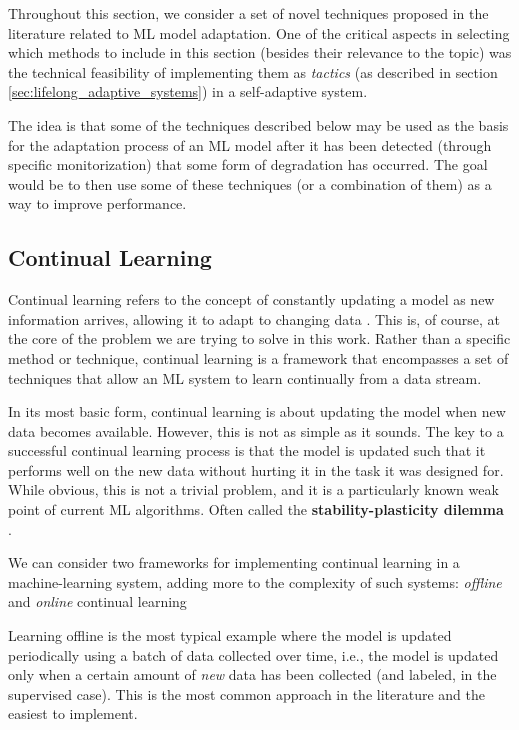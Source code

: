 \documentclass[../main.tex]{subfiles}
\begin{document}
    Throughout this section, we consider a set of novel techniques proposed in the literature related to ML model adaptation. One of the critical aspects in selecting which methods to include in this section (besides their relevance to the topic) was the technical feasibility of implementing them as \textit{tactics} (as described in section \ref{sec:lifelong_adaptive_systems}) in a self-adaptive system. 

    The idea is that some of the techniques described below may be used as the basis for the adaptation process of an ML model after it has been detected (through specific monitorization) that some form of degradation has occurred. The goal would be to then use some of these techniques (or a combination of them) as a way to improve performance.

    \subsection{Continual Learning} \label{sec:continual_learning} 
	
    Continual learning refers to the concept of constantly updating a model as new information arrives, allowing it to adapt to changing data \cite{huyen_designing_2022}. This is, of course, at the core of the problem we are trying to solve in this work. Rather than a specific method or technique, continual learning is a framework that encompasses a set of techniques that allow an ML system to learn continually from a data stream.

    In its most basic form,  continual learning is about updating the model when new data becomes available. However, this is not as simple as it sounds. The key to a successful continual learning process is that the model is updated such that it performs well on the new data without hurting it in the task it was designed for. While obvious, this is not a trivial problem, and it is a particularly known weak point of current ML algorithms. Often called the \textbf{stability-plasticity dilemma} \cite{mermillodStabilityplasticityDilemmaInvestigating2013}.

    We can consider two frameworks for implementing continual learning in a machine-learning system, adding more to the complexity of such systems: \textit{offline} and \textit{online} continual learning
    
    Learning offline is the most typical example where the model is updated periodically using a batch of data collected over time, i.e., the model is updated only when a certain amount of \textit{new} data has been collected (and labeled, in the supervised case). This is the most common approach in the literature and the easiest to implement.
    
\end{document}
